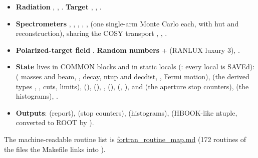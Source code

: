 \begin{itemize}
 (+ CTEQ5, fDSS, F1F2IN21), , , , ,
, .
\item \textbf{Radiation} , , . \textbf{Target} , , .
\item \textbf{Spectrometers} , , , , ,  (one  single-arm Monte Carlo each,
with hut and reconstruction),\allowbreak{} sharing the COSY transport , , .
\item \textbf{Polarized-target field} . \textbf{Random numbers}  +  (RANLUX luxury 3),
.
\item \textbf{State} lives in COMMON blocks and in static locals (: every local is SAVEd):
 ( masses and beam, ,  decay,  ntup and decdist,
,  Fermi motion),  (the derived types , , cuts, limits),
 (),  (), ,  (),
 (, ),  and  (the
aperture stop counters),  (the  histograms),\allowbreak{} .
\item \textbf{Outputs}:  (report),  (stop counters),  (histograms),\allowbreak{}  (HBOOK-like
ntuple, converted to ROOT by ).
\end{itemize}
The machine-readable routine list is \hyperref[translation_report-fortranu5froutineu5fmap]{fortran\_\allowbreak{}routine\_\allowbreak{}map.\allowbreak{}md} (172 routines of the files
the Makefile links into ).

